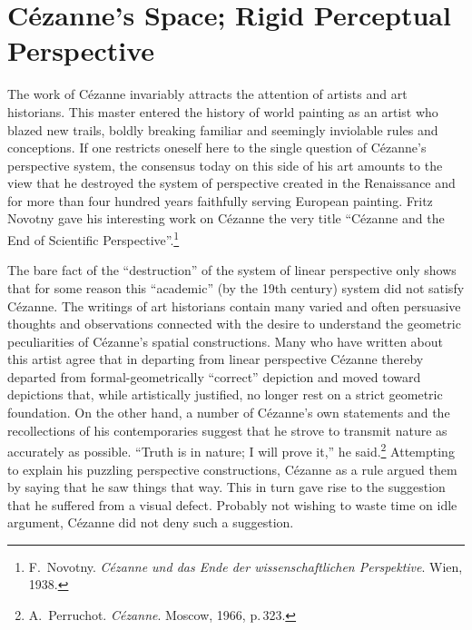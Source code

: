 
\chapter{C\'ezanne's Space; Rigid Perceptual Perspective}


The work of Cézanne invariably attracts the attention of artists and art historians.
This master entered the history of world painting as an artist who blazed new trails,
boldly breaking familiar and seemingly inviolable rules and conceptions. If one
restricts oneself here to the single question of Cézanne's perspective system, the
consensus today on this side of his art amounts to the view that he destroyed the
system of perspective created in the Renaissance and for more than four hundred years
faithfully serving European painting. Fritz Novotny gave his interesting work on
Cézanne the very title ``Cézanne and the End of Scientific
Perspective''.\footnote{F.~Novotny. \emph{C\'ezanne und das Ende der
  wissenschaftlichen Perspektive}. Wien, 1938.}

The bare fact of the ``destruction'' of the system of linear perspective only shows
that for some reason this ``academic'' (by the 19th century) system did not satisfy
Cézanne. The writings of art historians contain many varied and often persuasive
thoughts and observations connected with the desire to understand the geometric
peculiarities of Cézanne's spatial constructions. Many who have written about this
artist agree that in departing from linear perspective Cézanne thereby departed from
formal-geometrically ``correct'' depiction and moved toward depictions that, while
artistically justified, no longer rest on a strict geometric foundation. On the other
hand, a number of Cézanne's own statements and the recollections of his
contemporaries suggest that he strove to transmit nature as accurately as possible.
``Truth is in nature; I will prove it,'' he
said.\footnote{A.~Perruchot. \emph{C\'ezanne}. Moscow, 1966, p.\,323.}
Attempting to explain his puzzling perspective constructions, Cézanne as a rule
argued them by saying that he saw things that way. This in turn gave rise to the
suggestion that he suffered from a visual defect. Probably not wishing to waste time
on idle argument, Cézanne did not deny such a suggestion.


